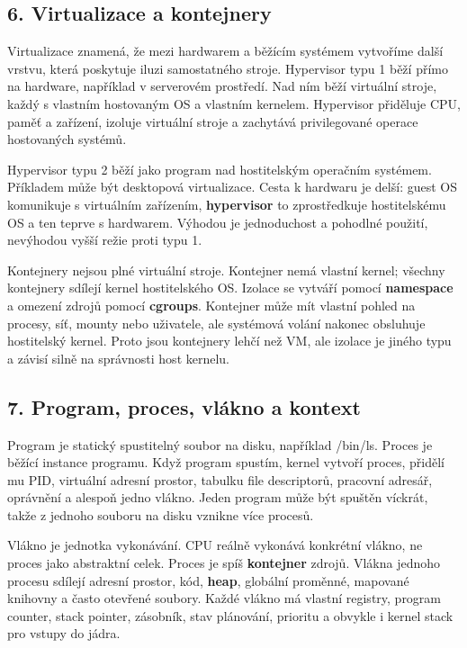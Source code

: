 \documentclass[11pt,a4paper]{article}
\begin{document}
\subsection*{6. Virtualizace a kontejnery}

Virtualizace znamená, že mezi hardwarem a běžícím systémem vytvoříme další vrstvu, která poskytuje iluzi samostatného stroje. Hypervisor typu 1 běží přímo na hardware, například v serverovém prostředí. Nad ním běží virtuální stroje, každý s vlastním hostovaným OS a vlastním kernelem. Hypervisor přiděluje CPU, paměť a zařízení, izoluje virtuální stroje a zachytává privilegované operace hostovaných systémů.

Hypervisor typu 2 běží jako program nad hostitelským operačním systémem. Příkladem může být desktopová virtualizace. Cesta k hardwaru je delší: guest OS komunikuje s virtuálním zařízením, \textbf{hypervisor} to zprostředkuje hostitelskému OS a ten teprve s hardwarem. Výhodou je jednoduchost a pohodlné použití, nevýhodou vyšší režie proti typu 1.

Kontejnery nejsou plné virtuální stroje. Kontejner nemá vlastní kernel; všechny kontejnery sdílejí kernel hostitelského OS. Izolace se vytváří pomocí \textbf{namespace} a omezení zdrojů pomocí \textbf{cgroups}. Kontejner může mít vlastní pohled na procesy, síť, mounty nebo uživatele, ale systémová volání nakonec obsluhuje hostitelský kernel. Proto jsou kontejnery lehčí než VM, ale izolace je jiného typu a závisí silně na správnosti host kernelu.

\subsection*{7. Program, proces, vlákno a kontext}

Program je statický spustitelný soubor na disku, například /bin/ls. Proces je běžící instance programu. Když program spustím, kernel vytvoří proces, přidělí mu PID, virtuální adresní prostor, tabulku file descriptorů, pracovní adresář, oprávnění a alespoň jedno vlákno. Jeden program může být spuštěn víckrát, takže z jednoho souboru na disku vznikne více procesů.

Vlákno je jednotka vykonávání. CPU reálně vykonává konkrétní vlákno, ne proces jako abstraktní celek. Proces je spíš \textbf{kontejner} zdrojů. Vlákna jednoho procesu sdílejí adresní prostor, kód, \textbf{heap}, globální proměnné, mapované knihovny a často otevřené soubory. Každé vlákno má vlastní registry, program counter, stack pointer, zásobník, stav plánování, prioritu a obvykle i kernel stack pro vstupy do jádra.
\end{document}
